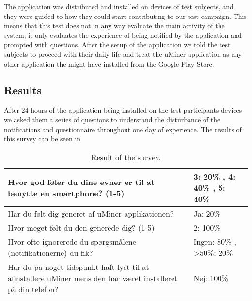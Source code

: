 The application was distributed and installed on devices of test subjects, and they were guided to how they could start contributing to our test campaign. This means that this test does not in any way evaluate the main activity of the system, it only evaluates the experience of being notified by the application and prompted with questions. After the setup of the application we told the test subjects to proceed with their daily life and treat the uMiner application as any other application the might have installed from the Google Play Store. 

\subsection{Results}
\label{sub:results}
After 24 hours of the application being installed on the test participants devices we asked them a series of questions to understand the disturbance of the notifications and questionnaire throughout one day of experience. The results of this survey can be seen in 

\begin{table}[]
\centering
\caption{Result of the survey.}
\label{tab:survey_result}
\begin{tabular}{|m{}|m{}|} \hline
Hvor god føler du dine evner er til at benytte en smartphone? (1-5)                                           & 3: 20\% , 4: 40\% , 5: 40\%			  \\ \hline
Har du følt dig generet af uMiner applikationen?                                                              & Ja: 20\% 							  \\ \hline
Hvor meget følt du den generede dig? (1-5)                                                                    & 2: 100\% 							  \\ \hline
Hvor ofte ignorerede du spørgsmålene (notifikationerne) du fik?                                               & Ingen: 80\% , \textgreater 50\%: 20\% \\ \hline
Har du på noget tidspunkt haft lyst til at afinstallere uMiner mens den har været installeret på din telefon? & Nej: 100\% \\ \hline
\end{tabular}
\end{table}



